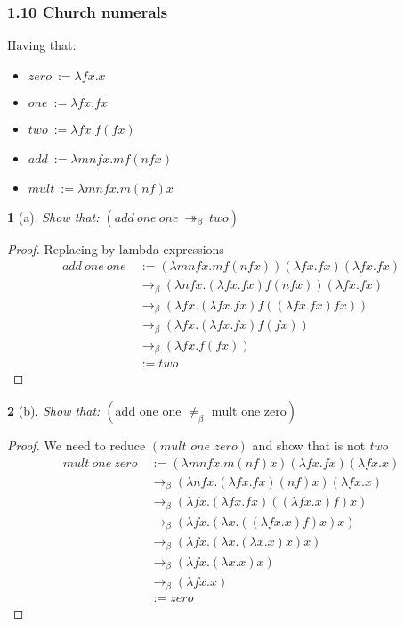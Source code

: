\documentclass[12pt, a4paper]{article}
\newcommand{\twobeta}{\twoheadrightarrow_\beta}
\newcommand{\onebeta}{\to_\beta}
\newtheorem*{exercise}{}
\begin{document}
\subsubsection{1.10 Church numerals}
Having that:
\begin{itemize}
    \item $zero \ := \lambda fx. x$
    \item $one \ := \lambda fx. fx$
    \item $two \ := \lambda fx. f(fx)$
    \item $add \ := \lambda mnfx. mf(nfx)$
    \item $mult \ := \lambda mnfx. m(nf)x$
\end{itemize}
\begin{exercise}[a]
    Show that: $(add\ one\ one\ \twobeta\ two)$
\end{exercise}
\begin{proof}
    Replacing by lambda expressions
    \begin{subequations}
        \begin{align}
            add\ one\ one\ &:= (\lambda mnfx. mf(nfx))(\lambda fx. fx)(\lambda fx. fx)\\
            &\onebeta (\lambda nfx. (\lambda fx. fx)f(nfx))(\lambda fx. fx)\\
            &\onebeta (\lambda fx. (\lambda fx. fx)f((\lambda fx. fx)fx))\\
            &\onebeta (\lambda fx. (\lambda fx. fx)f(fx))\\
            &\onebeta (\lambda fx. f(fx))\\
            &:= two
        \end{align}
    \end{subequations}
\end{proof}

\begin{exercise}[b]
    Show that: $(\text{add one one }\neq_\beta \text{ mult one zero})$
\end{exercise}
\begin{proof}
    We need to reduce $(\textit{mult one zero})$ and show that is not \textit{two}
    \begin{subequations}
        \begin{align}
            mult\ one\ zero\ &:= (\lambda mnfx. m(nf)x)(\lambda fx. fx)(\lambda fx. x)\\
            &\onebeta (\lambda nfx. (\lambda fx. fx)(nf)x)(\lambda fx. x)\\
            &\onebeta (\lambda fx. (\lambda fx. fx)((\lambda fx. x)f)x)\\
            &\onebeta (\lambda fx. (\lambda x. ((\lambda fx. x)f)x)x)\\
            &\onebeta (\lambda fx. (\lambda x. (\lambda x. x)x)x)\\
            &\onebeta (\lambda fx. (\lambda x. x)x)\\
            &\onebeta (\lambda fx. x)\\
            &:= zero
        \end{align}
    \end{subequations}
\end{proof}
\end{document}
